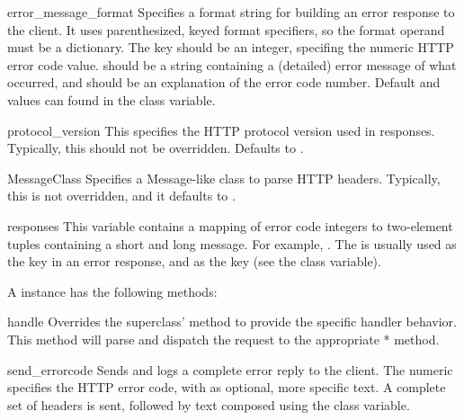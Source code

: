 \begin{datadesc}{error_message_format}
Specifies a format string for building an error response to the
client. It uses parenthesized, keyed format specifiers, so the
format operand must be a dictionary. The  key should
be an integer, specifing the numeric HTTP error code value.
 should be a string containing a (detailed) error
message of what occurred, and  should be an
explanation of the error code number. Default 
and  values can found in the 
class variable.
\end{datadesc}

\begin{datadesc}{protocol_version}
This specifies the HTTP protocol version used in responses.
Typically, this should not be overridden. Defaults to
.
\end{datadesc}

\begin{datadesc}{MessageClass}
Specifies a Message-like class to parse HTTP headers. Typically,
this is not overridden, and it defaults to .
\end{datadesc}

\begin{datadesc}{responses}
This variable contains a mapping of error code integers to two-element
tuples containing a short and long message. For example,
. The
 is usually used as the  key in an
error response, and  as the  key
(see the  class variable).
\end{datadesc}


A  instance has the following methods:

\begin{funcdesc}{handle}{}
Overrides the superclass'  method to provide the
specific handler behavior. This method will parse and dispatch
the request to the appropriate * method.
\end{funcdesc}

\begin{funcdesc}{send_error}{code}
Sends and logs a complete error reply to the client. The numeric
 specifies the HTTP error code, with  as
optional, more specific text. A complete set of headers is sent,
followed by text composed using the 
class variable.
\end{funcdesc}

